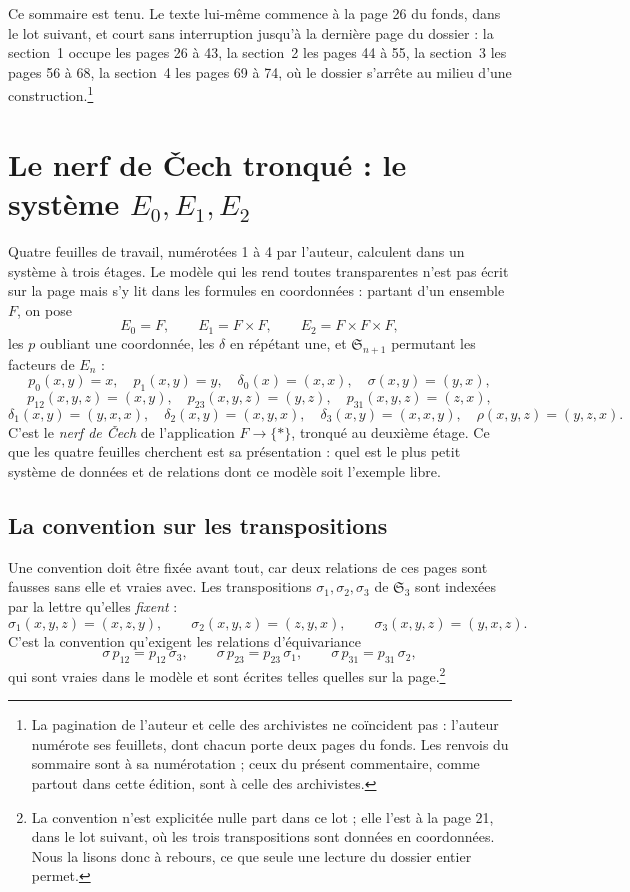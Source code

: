 \documentclass[11pt,a4paper]{article}
\begin{document}
Ce sommaire est tenu. Le texte lui-même commence à la page 26 du fonds, dans le
lot suivant, et court sans interruption jusqu'à la dernière page du dossier : la
section~1 occupe les pages 26 à 43, la section~2 les pages 44 à 55, la
section~3 les pages 56 à 68, la section~4 les pages 69 à 74, où le dossier
s'arrête au milieu d'une construction.\footnote{La pagination de l'auteur et
celle des archivistes ne coïncident pas : l'auteur numérote ses feuillets, dont
chacun porte deux pages du fonds. Les renvois du sommaire sont à sa
numérotation ; ceux du présent commentaire, comme partout dans cette édition,
sont à celle des archivistes.}

\section*{Le nerf de Čech tronqué : le système $E_{0}, E_{1}, E_{2}$}

Quatre feuilles de travail, numérotées 1 à 4 par l'auteur, calculent dans un
système à trois étages. Le modèle qui les rend toutes transparentes n'est pas
écrit sur la page mais s'y lit dans les formules en coordonnées : partant d'un
ensemble $F$, on pose
\[
  E_{0} = F, \qquad E_{1} = F \times F, \qquad E_{2} = F \times F \times F,
\]
les $p$ oubliant une coordonnée, les $\delta$ en répétant une, et
$\mathfrak{S}_{n+1}$ permutant les facteurs de $E_{n}$ :
\[
  p_{0}(x,y) = x, \quad p_{1}(x,y) = y, \quad \delta_{0}(x) = (x,x),
  \quad \sigma(x,y) = (y,x),
\]
\[
  p_{12}(x,y,z) = (x,y), \quad p_{23}(x,y,z) = (y,z), \quad
  p_{31}(x,y,z) = (z,x),
\]
\[
  \delta_{1}(x,y) = (y,x,x), \quad \delta_{2}(x,y) = (x,y,x), \quad
  \delta_{3}(x,y) = (x,x,y), \quad \rho(x,y,z) = (y,z,x).
\]
C'est le \emph{nerf de Čech} de l'application $F \to \{*\}$, tronqué au
deuxième étage. Ce que les quatre feuilles cherchent est sa présentation : quel
est le plus petit système de données et de relations dont ce modèle soit
l'exemple libre.

\subsection*{La convention sur les transpositions}

Une convention doit être fixée avant tout, car deux relations de ces pages sont
fausses sans elle et vraies avec. Les transpositions $\sigma_{1}, \sigma_{2},
\sigma_{3}$ de $\mathfrak{S}_{3}$ sont indexées par la lettre qu'elles
\emph{fixent} :
\[
  \sigma_{1}(x,y,z) = (x,z,y), \qquad
  \sigma_{2}(x,y,z) = (z,y,x), \qquad
  \sigma_{3}(x,y,z) = (y,x,z).
\]
C'est la convention qu'exigent les relations d'équivariance
\[
  \sigma\, p_{12} = p_{12}\,\sigma_{3}, \qquad
  \sigma\, p_{23} = p_{23}\,\sigma_{1}, \qquad
  \sigma\, p_{31} = p_{31}\,\sigma_{2},
\]
qui sont vraies dans le modèle et sont écrites telles quelles sur la
page.\footnote{La convention n'est explicitée nulle part dans ce lot ; elle
l'est à la page 21, dans le lot suivant, où les trois transpositions sont
données en coordonnées. Nous la lisons donc à rebours, ce que seule une lecture
du dossier entier permet.}
\end{document}
